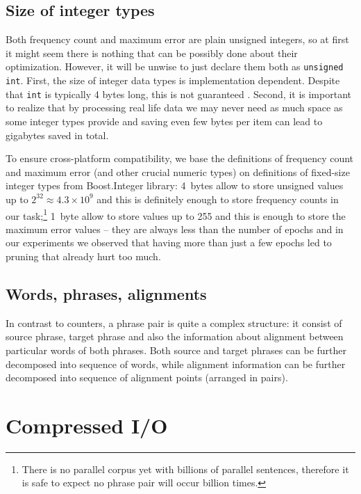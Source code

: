 \subsection{Size of integer types}

Both frequency count and maximum error are plain unsigned integers, so at first it might seem
there is nothing that can be possibly done about their optimization.
However, it will be unwise to just declare them both as \verb|unsigned int|.
First, the size of integer data types is implementation dependent.
Despite that \verb|int| is typically 4 bytes long, this is not guaranteed \citep[Chapter 4.6]{stroustrup:cplusplus}.
Second, it is important to realize that by processing real life data we may never need as much
space as some integer types provide and saving even few bytes per item can lead to gigabytes
saved in total.

To ensure cross-platform compatibility, we base the definitions of frequency count and maximum
error (and other crucial numeric types) on definitions of fixed-size integer types from Boost.Integer
library:
4~bytes allow to store unsigned values up to $2^{32} \approx 4.3 \times 10^9$ and this is definitely
enough to store frequency counts in our task;\footnote{There is no parallel corpus yet with billions
of parallel sentences, therefore it is safe to expect no phrase pair will occur billion times.}
1~byte allow to store values up to 255 and this is enough to store the maximum error values
-- they are always less than the number of epochs and in our experiments we observed that having
more than just a few epochs led to pruning that already hurt too much.

\subsection{Words, phrases, alignments}


In contrast to counters, a phrase pair is quite a complex structure: it consist of source phrase,
target phrase and also the information about alignment between particular words of both phrases.
Both source and target phrases can be further decomposed into sequence of words, while alignment
information can be further decomposed into sequence of alignment points (arranged in pairs).

\section{Compressed I/O}

